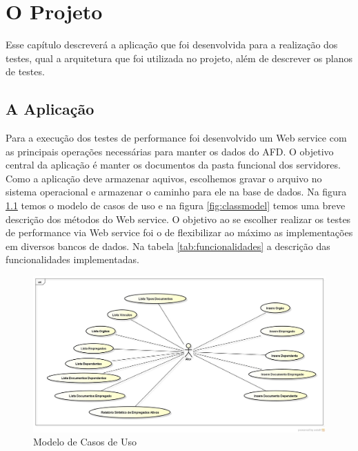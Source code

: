 \chapter{O Projeto}

Esse capítulo descreverá a aplicação que foi desenvolvida para a realização dos testes, qual a arquitetura que foi utilizada no projeto, além de descrever os planos de testes.


\section{A Aplicação}

Para a execução dos testes de performance foi desenvolvido um Web service com as principais operações necessárias para manter os dados do AFD. O objetivo central da aplicação é manter os documentos da pasta funcional dos servidores. Como a aplicação deve armazenar aquivos, escolhemos gravar o arquivo no sistema operacional e armazenar o caminho para ele na base de dados. Na figura \ref{fig:ucmodel} temos o modelo de casos de uso e na figura \ref{fig:classmodel} temos uma breve descrição dos métodos do Web service. O objetivo ao se escolher realizar os testes de performance via Web service foi o de flexibilizar ao máximo as implementações em diversos bancos de dados. Na tabela \ref{tab:funcionalidades} a descrição das funcionalidades implementadas.

	\begin{figure}[!htbp]
		\begin{center}
			\includegraphics[width=1\textwidth]{diagrama_geral}
		\end{center}
		\caption{Modelo de Casos de Uso}
		\label{fig:ucmodel}
	\end{figure}

